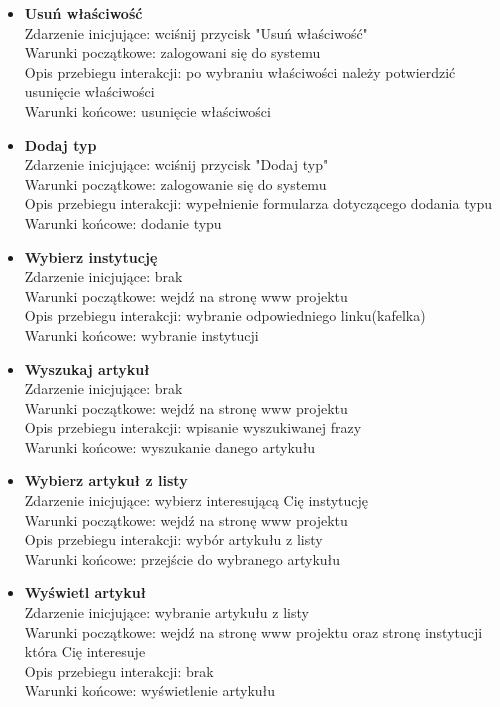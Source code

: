 \documentclass{article}
\begin{document}
\begin{itemize}
	
	\item \textbf{Usuń właściwość}
	\\Zdarzenie inicjujące: wciśnij przycisk "Usuń właściwość"
	\\Warunki początkowe: zalogowani się do systemu
	\\Opis przebiegu interakcji: po wybraniu właściwości należy potwierdzić usunięcie właściwości
	\\Warunki końcowe: usunięcie właściwości

	
	\item \textbf{Dodaj typ}
	\\Zdarzenie inicjujące: wciśnij przycisk "Dodaj typ"
	\\Warunki początkowe: zalogowanie się do systemu
	\\Opis przebiegu interakcji: wypełnienie formularza dotyczącego dodania typu
	\\Warunki końcowe: dodanie typu



	
	\item \textbf{Wybierz instytucję}
	\\Zdarzenie inicjujące: brak
	\\Warunki początkowe: wejdź na stronę www projektu
	\\Opis przebiegu interakcji: wybranie odpowiedniego linku(kafelka)
	\\Warunki końcowe: wybranie instytucji

	
	\item \textbf{Wyszukaj artykuł}
	\\Zdarzenie inicjujące: brak
	\\Warunki początkowe: wejdź na stronę www projektu
	\\Opis przebiegu interakcji: wpisanie wyszukiwanej frazy 
	\\Warunki końcowe: wyszukanie danego artykułu
	
	
	\item \textbf{Wybierz artykuł z listy}
	\\Zdarzenie inicjujące: wybierz interesującą Cię instytucję
	\\Warunki początkowe: wejdź na stronę www projektu
	\\Opis przebiegu interakcji: wybór artykułu z listy
	\\Warunki końcowe: przejście do wybranego artykułu

	
	\item \textbf{Wyświetl artykuł}
	\\Zdarzenie inicjujące: wybranie artykułu z listy
	\\Warunki początkowe: wejdź na stronę www projektu oraz stronę instytucji która Cię interesuje
	\\Opis przebiegu interakcji: brak
	\\Warunki końcowe: wyświetlenie artykułu	



\end{itemize}
\end{document}
